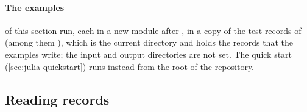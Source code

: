 \paragraph{The examples} of this section run, each in a new module after , in a copy of the test records of  (among them ),
which is the current directory and holds the records that the examples write; the input
and output directories are not set. The quick start (\cref{sec:julia-quickstart}) runs
instead from the root of the repository.

\subsection{Reading records}
\label{sec:julia-reading}


